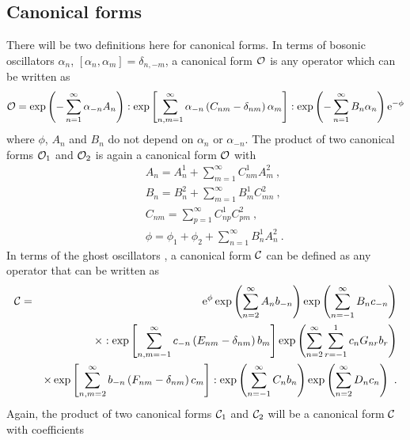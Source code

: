 \documentclass[a4paper,11pt]{article}
\begin{document}
\subsection{Canonical forms}

There will be two definitions here for canonical forms. In terms of bosonic oscillators \cite{cg1} $\alpha _n$, $[\alpha _n,\alpha _m]=\delta _{n,-m}$, a canonical form ${\cal O}$ is any operator which can be written as
\begin{equation}
{\cal O} = \exp \left( -\sum_{n=1}^\infty \alpha _{-n}A_n\right) :\exp \left[ \sum_{n,m=1}^\infty \alpha _{-n}\left( C_{nm}-\delta _{nm}\right) \alpha _m\right] : \exp \left( -\sum_{n=1}^\infty B_n\alpha _n\right) {\rm e}^{-\phi }
\end{equation}
where $\phi $, $A_n$ and $B_n$ do not depend on $\alpha _n$ or $\alpha _{-n}$.
The product of two canonical forms ${\cal O}_1$ and ${\cal O}_2$ is again a canonical form ${\cal O}$ with
\begin{eqnarray}
 & & A_n=A_n^1+\sum_{m=1}^\infty C_{nm}^1A_m^2\ ,\\
 & & B_n=B_n^2+\sum_{m=1}^\infty B_m^1C_{mn}^2\ ,\\
 & & C_{nm}=\sum_{p=1}^\infty C_{np}^1C_{pm}^2\ ,\\
 & & \phi =\phi _1+\phi _2+\sum_{n=1}^\infty B_n^1A_n^2\ .
\end{eqnarray}
In terms of the ghost oscillators \cite{cg2}, a canonical form ${\cal C}$ can be defined as any operator that can be written as
\begin{eqnarray}
{\cal C} & = & {\rm e}^\phi \exp \left( \sum_{n=2}^\infty A_nb_{-n}\right) \exp \left( \sum_{n=-1}^\infty B_nc_{-n}\right) \nonumber \\ 
 & & \times :\exp \left[ \sum_{n,m=-1}^\infty c_{-n}\left( E_{nm}-\delta _{nm}\right) b_m\right] \exp \left( \sum_{n=2}^\infty \sum_{r=-1}^1c_nG_{nr}b_r\right) \nonumber \\
 & & \times \exp \left[ \sum_{n,m=2}^\infty b_{-n}\left( F_{nm}-\delta _{nm}\right) c_m\right] :\exp \left( \sum_{n=-1}^\infty C_nb_n\right) \exp \left( \sum_{n=2}^\infty D_nc_n\right) \ .
\end{eqnarray}
Again, the product of two canonical forms ${\cal C}_1$ and ${\cal C}_2$ will be a canonical form ${\cal C}$ with coefficients
\end{document}
